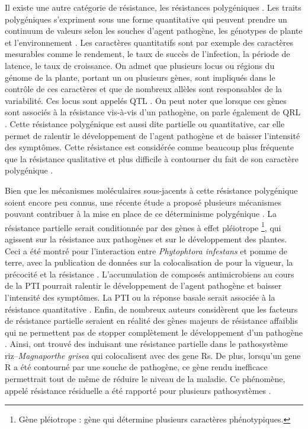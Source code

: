	Il existe une autre catégorie  de résistance, les résistances polygéniques  \citep{Cooper1983}. Les traits polygéniques s'expriment sous une forme quantitative  qui peuvent prendre un continuum de valeurs selon les souches
d’agent pathogène, les génotypes de plante et l’environnement \citep{Pariaud2009}.
Les  caractères quantitatifs sont par exemple des caractères mesurables comme le rendement, le taux de succès de l'infection, la période de latence, le taux de croissance. On admet que plusieurs locus ou régions du génome de la plante, portant un ou plusieurs gènes, sont impliqués dans le contrôle de ces caractères et que de nombreux allèles sont responsables de la variabilité. Ces locus sont appelés \gls{QTL}  \citep{Lannou2012}.
On peut noter que lorsque  ces gènes sont associés à la résistance vis-à-vis d’un pathogène, on parle également de \gls{QRL} \citep{Young1996}. Cette résistance polygénique est aussi dite  partielle
ou quantitative,  car elle permet
de ralentir le développement de l’agent pathogène et de baisser l'intensité des symptômes.
Cette résistance est considérée comme  beaucoup plus
fréquente que la résistance qualitative et plus difficile à contourner du fait de son caractère polygénique  \citep{Kearsey1998, Sage-Palloix2007, Parlevliet1989}. 
	
	Bien que   les mécanismes moléculaires sous-jacents à cette résistance polygénique soient encore peu connus, une récente étude a proposé plusieurs mécanismes pouvant contribuer à la mise en place de ce déterminisme polygénique \citep{Poland2009}.
La résistance partielle serait conditionnée par des gènes à effet pléiotrope \footnote{Gène pléiotrope : gène qui détermine plusieurs caractères phénotypiques.}, qui agissent sur la résistance aux pathogènes et sur le
développement des plantes.  
Ceci a été montré pour l'interaction entre \textit{Phytophtora infestans} et pomme de terre, avec la publication de données  sur la colocalisation de  pour la vigueur, la précocité et la
résistance  \citep{Collins1999}.
L’accumulation de composés antimicrobiens au
cours de la \gls{PTI} pourrait ralentir le développement de l’agent pathogène et baisser l’intensité des symptômes. La \gls{PTI} ou la réponse basale serait associée à la résistance  quantitative  \citep{Boller2009}.
Enfin, de nombreux  auteurs considèrent que les facteurs de résistance partielle seraient en réalité  des gènes  majeurs de résistance \og affaiblis \fg{} qui ne permettent pas de stopper complètement le
développement d’un pathogène  \citep{Parlevliet1977, Young1996}. 
Ainsi, \citep{Wang1994} ont  trouvé  des  induisant une résistance partielle dans le pathosystème riz--\textit{Magnaporthe grisea} qui colocalisent avec des \glspl{gene R}. De plus,
lorsqu’un \gls{gene R} a été contourné par une souche de pathogène, ce
gène rendu inefficace permettrait tout de même de réduire le niveau de la maladie. Ce phénomène, appelé  résistance résiduelle  a été rapporté pour plusieurs pathosystèmes \citep{Nass1981, Brodny1986}.

